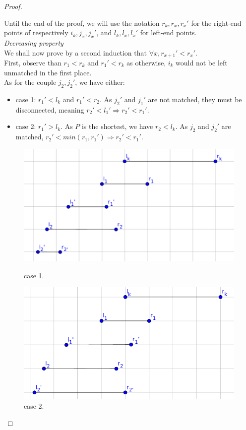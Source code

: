 \documentclass[12pt]{article}
\begin{document}
\begin{proof}
\begin{itemize}
    \end{itemize}

    Until the end of the proof, we will use the notation $r_k, r_x, r_x'$ for the right-end points of respectively $i_k, j_x, j_x'$, and $l_k, l_x, l_x'$ for left-end points.  \\

    \textit{Decreasing property}\\
    We shall now prove by a second induction that $\forall x, r_{x+1}' < r_x'$.\\
    First, observe than $r_1 < r_k$ and $r_1' < r_k$ as otherwise, $i_k$ would not be left unmatched in the first place. \\
    As for the couple $j_2, j_2'$, we have either:
    \begin{itemize}
        \item case 1: $r_1' < l_k$ and $r_1'< r_2$. As $j_2'$ and $j_1'$ are not matched, they must be disconnected, meaning $r_2' < l_1' \Rightarrow r_2' < r_1'.$ 
        \item case 2: $r_1' > l_k$. As $P$ is the shortest, we have $r_2 < l_k$. As $j_2$ and $j_2'$ are matched, $r_2' < min(r_1, r_1') \Rightarrow r_2' < r_1'$.  
    \end{itemize}
    \begin{figure}[h]
        \centering
        \includegraphics[scale=0.20]{case1.png}
        \caption{case 1.}
        \includegraphics[scale=0.20]{case_2.png}
        \caption{case 2.}
    \end{figure}


\end{proof}
\end{document}

